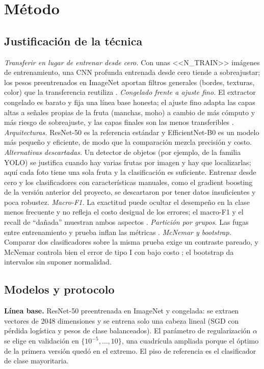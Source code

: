 \documentclass[10pt,twocolumn,letterpaper]{article}
\begin{document}
\section{Método}
\subsection{Justificación de la técnica}
\textit{Transferir en lugar de entrenar desde cero.} Con unas <<N_TRAIN>> imágenes de entrenamiento, una CNN profunda entrenada desde cero tiende a sobreajustar; los pesos preentrenados en ImageNet \cite{rus} aportan filtros generales (bordes, texturas, color) que la transferencia reutiliza \cite{pan,yos}. \textit{Congelado frente a ajuste fino.} El extractor congelado es barato y fija una línea base honesta; el ajuste fino adapta las capas altas a señales propias de la fruta (manchas, moho) a cambio de más cómputo y más riesgo de sobreajuste, y las capas finales son las menos transferibles \cite{yos}. \textit{Arquitecturas.} ResNet-50 \cite{he} es la referencia estándar y EfficientNet-B0 \cite{tan} es un modelo más pequeño y eficiente, de modo que la comparación mezcla precisión y costo. \textit{Alternativas descartadas.} Un detector de objetos (por ejemplo, de la familia YOLO) se justifica cuando hay varias frutas por imagen y hay que localizarlas; aquí cada foto tiene una sola fruta y la clasificación es suficiente. Entrenar desde cero y los clasificadores con características manuales, como el gradient boosting de la versión anterior del proyecto, se descartaron por tener datos insuficientes y poca robustez. \textit{Macro-F1.} La exactitud puede ocultar el desempeño en la clase menos frecuente y no refleja el costo desigual de los errores; el macro-F1 y el recall de ``dañada'' muestran ambos aspectos \cite{sok}. \textit{Partición por grupos.} Las fugas entre entrenamiento y prueba inflan las métricas \cite{kau}. \textit{McNemar y bootstrap.} Comparar dos clasificadores sobre la misma prueba exige un contraste pareado, y McNemar controla bien el error de tipo I con bajo costo \cite{die}; el bootstrap \cite{efr} da intervalos sin suponer normalidad.
\subsection{Modelos y protocolo}
\textbf{Línea base.} ResNet-50 preentrenada en ImageNet y congelada: se extraen vectores de 2048 dimensiones y se entrena solo una cabeza lineal (SGD con pérdida logística y pesos de clase balanceados). El parámetro de regularización $\alpha$ se elige en validación en $\{10^{-5},\dots,10\}$, una cuadrícula ampliada porque el óptimo de la primera versión quedó en el extremo. El piso de referencia es el clasificador de clase mayoritaria.
\end{document}
